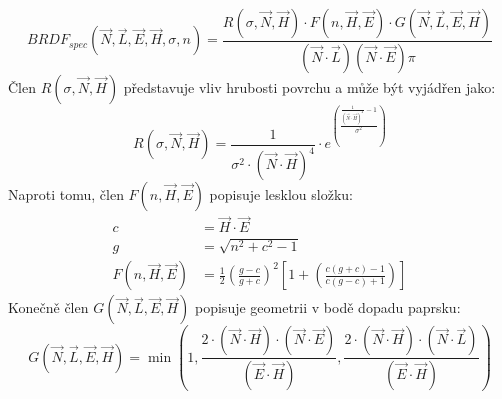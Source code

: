 \begin{equation}
\label{eq:brdf}
BRDF_{spec}(\vec{N}, \vec{L}, \vec{E}, \vec{H}, \sigma, n) = \frac{R(\sigma, \vec{N}, \vec{H}) \cdot F(n, \vec{H}, \vec{E}) \cdot G(\vec{N}, \vec{L}, \vec{E},\vec{H}) }{(\vec{N}\cdot\vec{L})(\vec{N}\cdot\vec{E})\pi}
\end{equation}
Člen $R(\sigma, \vec{N}, \vec{H})$ představuje vliv hrubosti povrchu a může být vyjádřen jako:
\begin{equation}
\label{eq:roughness}
R(\sigma, \vec{N}, \vec{H}) = \frac{1}{\sigma^2 \cdot ( \vec{N}\cdot\vec{H})^4} \cdot e^{\left ( \frac{\frac{1}{ ( \vec{N}\cdot\vec{H})^2} -1}{\sigma^2}\right )}
\end{equation}
Naproti tomu, člen $F(n, \vec{H}, \vec{E})$ popisuje lesklou složku:
\begin{align}
\label{eq:fresnel}
c &= \vec{H} \cdot \vec{E} \nonumber\\
g &= \sqrt{n^2 + c^2 - 1}\nonumber\\
F(n, \vec{H}, \vec{E}) &= \frac{1}{2} \left ( \frac{g-c}{g+c} \right)^2 \left [  1+ \left( \frac{c (g+c)-1}{c(g-c)+1}\right)\right ]
\end{align}
Konečně člen $G(\vec{N}, \vec{L}, \vec{E},\vec{H})$ popisuje geometrii v bodě dopadu paprsku:
\begin{equation}
\label{eq:geometry}
G(\vec{N}, \vec{L}, \vec{E},\vec{H}) = \min{} \left( 1, \frac{2\cdot(\vec{N}\cdot\vec{H})\cdot(\vec{N}\cdot\vec{E})}{(\vec{E}\cdot\vec{H})}, \frac{2\cdot(\vec{N}\cdot\vec{H})\cdot(\vec{N}\cdot\vec{L})}{(\vec{E}\cdot\vec{H})} \right)
\end{equation}

